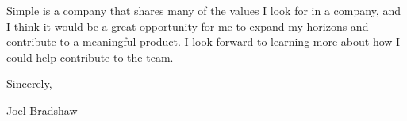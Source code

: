 \documentclass[letterpaper,12pt]{article}
\begin{document}
\begin{paracol}{2}
Simple is a company that shares many of the values I look for in a company, and I think it would be a great
opportunity for me to expand my horizons and contribute to a meaningful product. I look forward to learning
more about how I could help contribute to the team.

Sincerely,

Joel Bradshaw


\flushpage
\end{paracol}
\end{document}
